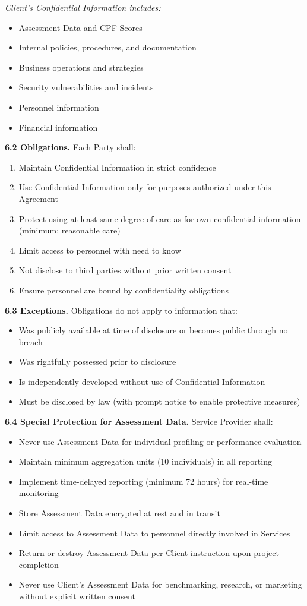 \documentclass[11pt,a4paper]{article}
\begin{document}
\textit{Client's Confidential Information includes:}
\begin{itemize}
\item Assessment Data and CPF Scores
\item Internal policies, procedures, and documentation
\item Business operations and strategies
\item Security vulnerabilities and incidents
\item Personnel information
\item Financial information
\end{itemize}

\textbf{6.2 Obligations.} Each Party shall:

\begin{enumerate}[label=\alph*)]
\item Maintain Confidential Information in strict confidence
\item Use Confidential Information only for purposes authorized under this Agreement
\item Protect using at least same degree of care as for own confidential information (minimum: reasonable care)
\item Limit access to personnel with need to know
\item Not disclose to third parties without prior written consent
\item Ensure personnel are bound by confidentiality obligations
\end{enumerate}

\textbf{6.3 Exceptions.} Obligations do not apply to information that:
\begin{itemize}
\item Was publicly available at time of disclosure or becomes public through no breach
\item Was rightfully possessed prior to disclosure
\item Is independently developed without use of Confidential Information
\item Must be disclosed by law (with prompt notice to enable protective measures)
\end{itemize}

\textbf{6.4 Special Protection for Assessment Data.} Service Provider shall:
\begin{itemize}
\item Never use Assessment Data for individual profiling or performance evaluation
\item Maintain minimum aggregation units (10 individuals) in all reporting
\item Implement time-delayed reporting (minimum 72 hours) for real-time monitoring
\item Store Assessment Data encrypted at rest and in transit
\item Limit access to Assessment Data to personnel directly involved in Services
\item Return or destroy Assessment Data per Client instruction upon project completion
\item Never use Client's Assessment Data for benchmarking, research, or marketing without explicit written consent
\end{itemize}
\end{document}
